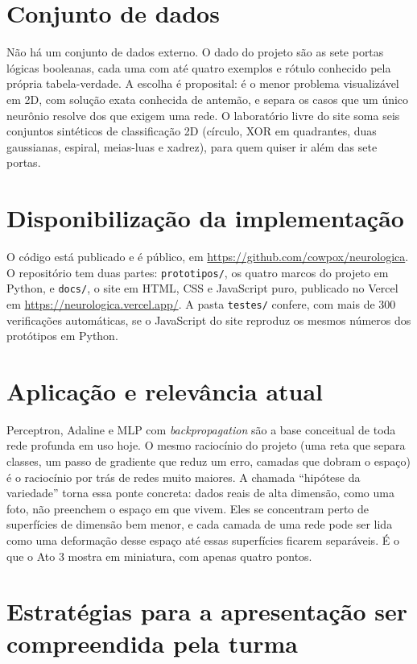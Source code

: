 \documentclass[11pt]{article}
\begin{document}
\section{Conjunto de dados}

Não há um conjunto de dados externo. O dado do projeto são as sete portas lógicas
booleanas, cada uma com até quatro exemplos e rótulo conhecido pela própria tabela-verdade.
A escolha é proposital: é o menor problema visualizável em 2D, com solução exata conhecida
de antemão, e separa os casos que um único neurônio resolve dos que exigem uma rede. O
laboratório livre do site soma seis conjuntos sintéticos de classificação 2D (círculo, XOR
em quadrantes, duas gaussianas, espiral, meias-luas e xadrez), para quem quiser ir além das
sete portas.

\section{Disponibilização da implementação}

O código está publicado e é público, em \url{https://github.com/cowpox/neurologica}. O
repositório tem duas partes: \texttt{prototipos/}, os quatro marcos do projeto em Python, e
\texttt{docs/}, o site em HTML, CSS e JavaScript puro, publicado no Vercel em
\url{https://neurologica.vercel.app/}. A pasta \texttt{testes/} confere, com mais de 300
verificações automáticas, se o JavaScript do site reproduz os mesmos números dos protótipos
em Python.

\section{Aplicação e relevância atual}

Perceptron, Adaline e MLP com \textit{backpropagation} são a base conceitual de toda rede
profunda em uso hoje. O mesmo raciocínio do projeto (uma reta que separa classes, um passo
de gradiente que reduz um erro, camadas que dobram o espaço) é o raciocínio por trás de
redes muito maiores. A chamada \enquote{hipótese da variedade} torna essa ponte concreta:
dados reais de alta dimensão, como uma foto, não preenchem o espaço em que vivem. Eles se
concentram perto de superfícies de dimensão bem menor, e cada camada de uma rede pode ser
lida como uma deformação desse espaço até essas superfícies ficarem separáveis. É o que o
Ato 3 mostra em miniatura, com apenas quatro pontos.

\section{Estratégias para a apresentação ser compreendida pela turma}
\end{document}
